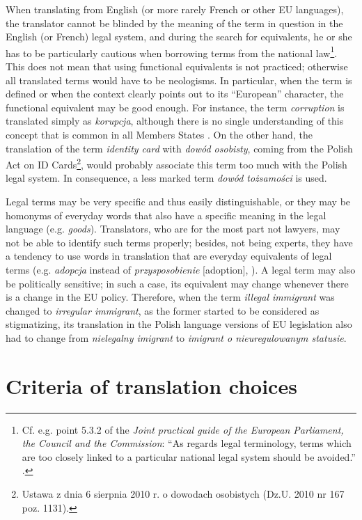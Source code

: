 \documentclass[output=paper]{langsci/langscibook}
\begin{document}
When translating from English (or more rarely French or other EU languages), the translator cannot be blinded by the meaning of the term in question in the English (or French) legal system, and during the search for equivalents, he or she has to be particularly cautious when borrowing terms from the national law\footnote{Cf. e.g. point 5.3.2 of the \textit{Joint practical guide of the European Parliament, the Council and the Commission}: “As regards legal terminology, terms which are too closely linked to a particular national legal system should be avoided.” \citep[18]{EU2015}.}. This does not mean that using functional equivalents is not practiced; otherwise all translated terms would have to be neologisms. In particular, when the term is defined or when the context clearly points out to its “European” character, the functional equivalent may be good enough. For instance, the term \textit{corruption} is translated simply as \textit{korupcja}, although there is no single understanding of this concept that is common in all Members States \citep{Szulik2012}. On the other hand, the translation of the term \textit{identity card} with \textit{dowód osobisty}, coming from the Polish Act on ID Cards\footnote{Ustawa z dnia 6 sierpnia 2010 r. o dowodach osobistych (Dz.U. 2010 nr 167 poz. 1131).}, would probably associate this term too much with the Polish legal system. In consequence, a less marked term \textit{dowód tożsamości} is used.

Legal terms may be very specific and thus easily distinguishable, or they may be homonyms of everyday words that also have a specific meaning in the legal language (e.g. \textit{goods}). Translators, who are for the most part not lawyers, may not be able to identify such terms properly; besides, not being experts, they have a tendency to use words in translation that are everyday equivalents of legal terms (e.g. \textit{adopcja} instead of \textit{przysposobienie} [adoption], \citealt[273]{Biel2014}). A legal term may also be politically sensitive; in such a case, its equivalent may change whenever there is a change in the EU policy. Therefore, when the term \textit{illegal immigrant} was changed to \textit{irregular immigrant}, as the former started to be considered as stigmatizing, its translation in the Polish language versions of EU legislation also had to change from \textit{nielegalny imigrant} to {\textit{imigrant o nieuregulowanym statusie}}.

\section{Criteria of translation choices}\label{sec:stefaniak:3}
\end{document}
